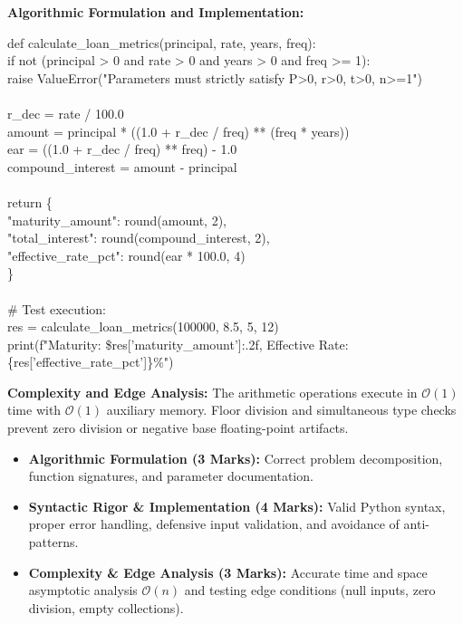 \begin{solbox}
\textbf{Algorithmic Formulation and Implementation:}
\begin{pycode}
def calculate\_loan\_metrics(principal, rate, years, freq):\\
\quad if not (principal > 0 and rate > 0 and years > 0 and freq >= 1):\\
\quad \quad raise ValueError("Parameters must strictly satisfy P>0, r>0, t>0, n>=1")\\
~\\
\quad r\_dec = rate / 100.0\\
\quad amount = principal * ((1.0 + r\_dec / freq) ** (freq * years))\\
\quad ear = ((1.0 + r\_dec / freq) ** freq) - 1.0\\
\quad compound\_interest = amount - principal\\
~\\
\quad return \{\\
\quad \quad "maturity\_amount": round(amount, 2),\\
\quad \quad "total\_interest": round(compound\_interest, 2),\\
\quad \quad "effective\_rate\_pct": round(ear * 100.0, 4)\\
\quad \}\\
~\\
\# Test execution:\\
res = calculate\_loan\_metrics(100000, 8.5, 5, 12)\\
print(f"Maturity: \${res['maturity\_amount']:.2f}, Effective Rate: \{res['effective\_rate\_pct']\}\%")
\end{pycode}
\textbf{Complexity and Edge Analysis:} The arithmetic operations execute in $\mathcal{O}(1)$ time with $\mathcal{O}(1)$ auxiliary memory. Floor division and simultaneous type checks prevent zero division or negative base floating-point artifacts.
\end{solbox}

\begin{examinertip}
\begin{itemize}[leftmargin=1.5em, itemsep=2pt]
    \item \textbf{Algorithmic Formulation (3 Marks):} Correct problem decomposition, function signatures, and parameter documentation.
    \item \textbf{Syntactic Rigor \& Implementation (4 Marks):} Valid Python syntax, proper error handling, defensive input validation, and avoidance of anti-patterns.
    \item \textbf{Complexity \& Edge Analysis (3 Marks):} Accurate time and space asymptotic analysis $\mathcal{O}(n)$ and testing edge conditions (null inputs, zero division, empty collections).
\end{itemize}
\end{examinertip}
